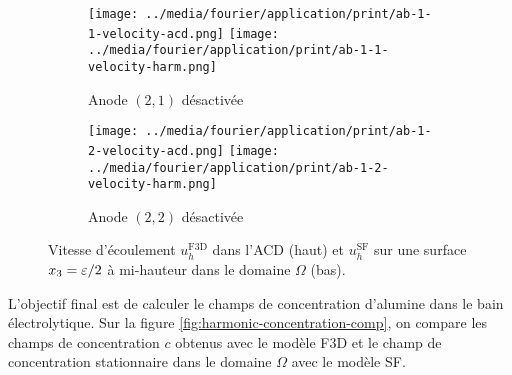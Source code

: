 \begin{figure}
  \begin{center}
    \begin{subfigure}[t]{\textwidth}
      \begin{center}
        \texttt{[image: ../media/fourier/application/print/ab-1-1-velocity-acd.png]}
        \texttt{[image: ../media/fourier/application/print/ab-1-1-velocity-harm.png]}
        \caption{Anode $(2,1)$ désactivée}
        \label{fig:}
      \end{center}
    \end{subfigure}

    \begin{subfigure}[t]{\textwidth}
      \begin{center}
        \texttt{[image: ../media/fourier/application/print/ab-1-2-velocity-acd.png]}
        \texttt{[image: ../media/fourier/application/print/ab-1-2-velocity-harm.png]}
        \caption{Anode $(2,2)$ désactivée}
        \label{fig:}
      \end{center}
    \end{subfigure}


    \caption{Vitesse d'écoulement $u_h^\mathrm{F3D}$ dans l'ACD (haut) et $u_h^\mathrm{SF}$ sur une surface
      $x_3 = \varepsilon / 2$ à mi-hauteur dans le domaine $\Omega$ (bas).}
    \label{fig:harmonic-velocity-comp}
  \end{center}
\end{figure}

L'objectif final est de calculer le champs de concentration d'alumine
dans le bain électrolytique. Sur la figure
\ref{fig:harmonic-concentration-comp}, on compare les champs de
concentration $c$ obtenus avec le modèle F3D et le champ de
concentration stationnaire dans le domaine $\Omega$ avec le modèle
SF.

